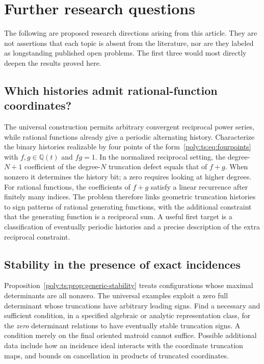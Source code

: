 \documentclass[11pt,a4paper]{article}
\numberwithin{equation}{section}
\theoremstyle{plain}
\newcommand{\Q}{\mathbb Q}
\begin{document}
\section{Further research questions}\label{poly:ts:sec:future}

The following are proposed research directions arising from this article.
They are not assertions that each topic is absent from the literature, nor
are they labeled as longstanding published open problems. The first three
would most directly deepen the results proved here.

\subsection{Which histories admit rational-function coordinates?}
The universal construction permits arbitrary convergent reciprocal power
series, while rational functions already give a periodic alternating
history. Characterize the binary histories realizable by four points of
the form~\eqref{poly:ts:eq:fourpoints} with $f,g\in\Q(t)$ and $fg=1$.
In the normalized reciprocal setting, the degree-$N+1$ coefficient of
the degree-$N$ truncation defect equals that of $f+g$. When nonzero it
determines the history bit; a zero requires looking at higher degrees.
For rational functions, the coefficients of $f+g$ satisfy a linear
recurrence after finitely many indices. The problem therefore links geometric truncation histories
to sign patterns of rational generating functions, with the additional
constraint that the generating function is a reciprocal sum. A useful
first target is a classification of eventually periodic histories and a
precise description of the extra reciprocal constraint.

\subsection{Stability in the presence of exact incidences}
Proposition~\ref{poly:ts:prop:generic-stability} treats configurations whose
maximal determinants are all nonzero. The universal examples exploit a
zero full determinant whose truncations have arbitrary leading signs.
Find a necessary and sufficient condition, in a specified algebraic or
analytic representation class, for the \emph{zero} determinant relations
to have eventually stable truncation signs. A condition merely on the
final oriented matroid cannot suffice. Possible additional data include
how an incidence ideal interacts with the coordinate truncation maps,
and bounds on cancellation in products of truncated coordinates.
\end{document}
